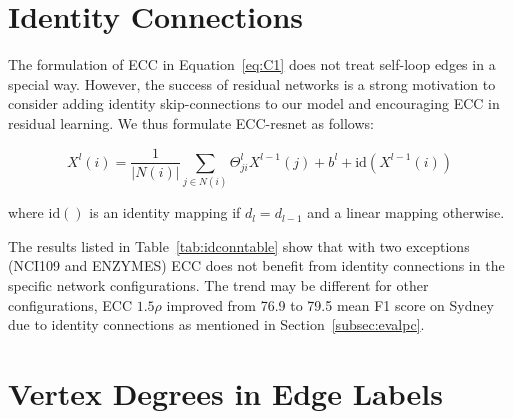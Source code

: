 \documentclass[10pt,twocolumn,letterpaper]{article}
\begin{document}
\section{Identity Connections} \label{sec:idconn}

The formulation of ECC in Equation~\ref{eq:C1} does not treat self-loop edges in a special way. However, the success of residual networks \cite{residuals} is a strong motivation to consider adding identity skip-connections to our model and encouraging ECC in residual learning. We thus formulate ECC-resnet as follows:

\begin{equation}
X^l(i) = \frac{1}{|N(i)|} \sum_{j\in N(i)} \Theta_{ji}^l X^{l-1}(j) + b^l + \mathrm{id}(X^{l-1}(i)) \label{eq:Crn}
\end{equation}

where $\mathrm{id}()$ is an identity mapping if $d_l=d_{l-1}$ and a linear mapping otherwise.

The results listed in Table~\ref{tab:idconntable} show that with two exceptions (NCI109 and ENZYMES) ECC does not benefit from identity connections in the specific network configurations. The trend may be different for other configurations, \eg ECC $1.5\rho$ improved from 76.9 to 79.5 mean F1 score on Sydney due to identity connections as mentioned in Section~\ref{subsec:evalpc}.



\begin{table}[bt]
\centering
{}
\vspace{1ex}
\caption{\label{tab:idconntable}
The effect of adding identity connections (improvements in italics). Performance metrics vary and are specific to each dataset, as introduced in the main paper.}
\end{table}





\section{Vertex Degrees in Edge Labels} \label{sec:degrees}
\end{document}
